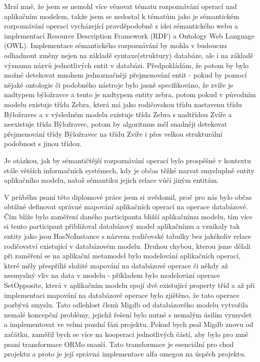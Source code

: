 \documentclass[11pt,twoside,a4paper]{book}
\begin{document}
Mrzí mně, že jsem se nemohl více věnovat tématu rozpoznávání operací nad
aplikačním modelem, takže jsem se nedostal k tématům jako je sémantickém
rozpoznávání operací vycházející pravděpodobně z idei sémantického
webu a implementací Resource Description Framework (RDF) a Ontology Web
Language (OWL). Implementace sémantického rozpoznávání by mohla v budoucnu
odhadnout změny nejen na základě syntaxe(struktury) databáze, ale i na základě
významu názvů jednotlivých entit v databázi. Předpokládám, že potom by bylo
možné detekovat mnohem jednoznačněji přejmenování entit - pokud by pomocí nějaké
ontologie či podobného nástroje bylo jasně specifikováno, že zvíře je nadtypem
býložravce a tento je nadtypem entity zebra, potom pokud v původním modelu
existuje třída Zebra, která má jako rodičovskou třídu nastavenu třídu
Býložravec a v výsledném modelu existuje třída Zebra s nadtřídou Zvíře a
neexistuje třída Býložravec, potom by algoritmus měl snadněji detekovat
přejmenování třídy Býložravec na třídu Zvíře i přes velkou strukturální
podobnost s jinou třídou.

Je otázkou, jak by sémantičtější rozpoznávání operací bylo prospěšné v
kontextu stále větších informačních systémech, kdy je občas těžké nazvat
smysluplně entity aplikačního modelu, natož sémantiku jejich relace vůči jiným
entitám.

V průběhu psaní této diplomové práce jsem si uvědomil, proč pro nás bylo občas
obtížné definovat správné mapování aplikačních operací na operace databázové.
Čím blíže bylo zaměření daného participanta bližší aplikačnímu modelu, tím více
si tento participant přibližoval databázový model aplikačnímu a vznikaly tak
entity jako jsou HasNoInstance s názvem rodičovské tabulky bez jakékoliv relace
rodičovství existující v databázovém modelu. Druhou chybou, kterou jsme
dělali při zaměření se na aplikační metamodel bylo modelování aplikačních
operací, které měly přespříliš složité mapování na databázové operace či někdy
až nesmyslný vliv na data v modelu - příkladem bylo modelování operace
SetOpposite, která v aplikačním modelu spojí dvě existující property tříd a až
při implementaci mapování na databázové operace bylo zjišťěno, že tato operace
pozbývá smyslu. Tato odlehlost členů Migdb od databázového modelu vytvořila
nemalé koncepční problémy, jejichž řešení bylo nutné s nemalým úsilím vymyslet
a implementovat ve velmi pozdní fázi projektu. Pokud bych psal Migdb znovu od
začátku, zaměřil bych se více na kooperaci jednotlivých částí, aby bylo pro mně
psaní transformace ORMo snazší. Tato transformace je esenciální pro chod
projektu a proto je její správná implementace alfa omegou na úspěch projektu.
\end{document}
